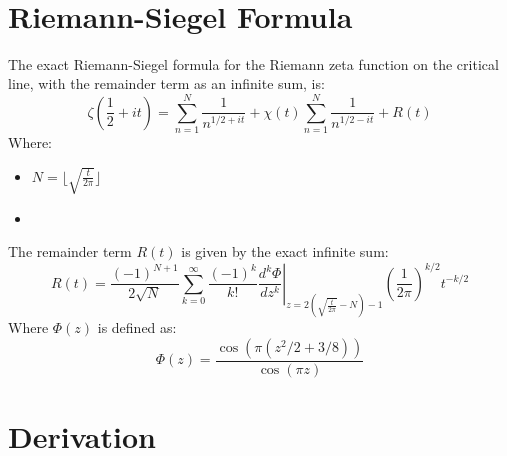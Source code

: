 \documentclass{article}
\begin{document}
\

\section*{Riemann-Siegel Formula}

The exact Riemann-Siegel formula for the Riemann zeta function on the critical
line, with the remainder term as an infinite sum, is:
\begin{equation}
  \zeta (\frac{1}{2} + it) = \sum_{n = 1}^N \frac{1}{n^{1 / 2 + it}} + \chi
  (t)  \sum_{n = 1}^N \frac{1}{n^{1 / 2 - it}} + R (t)
\end{equation}
Where:
\begin{itemize}
  \item $N = \lfloor \sqrt{\frac{t}{2 \pi}} \rfloor$
  
  \item 
\end{itemize}
The remainder term $R (t)$ is given by the exact infinite sum:
\begin{equation}
  R (t) = \frac{(- 1)^{N + 1}}{2 \sqrt{N}}  \sum_{k = 0}^{\infty} \frac{(-
  1)^k}{k!} \left. \frac{d^k \Phi}{dz^k} \right|_{z = 2 (\sqrt{\frac{t}{2
  \pi}} - N) - 1} \left( \frac{1}{2 \pi} \right)^{k / 2} t^{- k / 2}
\end{equation}
Where $\Phi (z)$ is defined as:
\begin{equation}
  \Phi (z) = \frac{\cos (\pi (z^2 / 2 + 3 / 8))}{\cos (\pi z)}
\end{equation}

\section*{Derivation}
\end{document}
